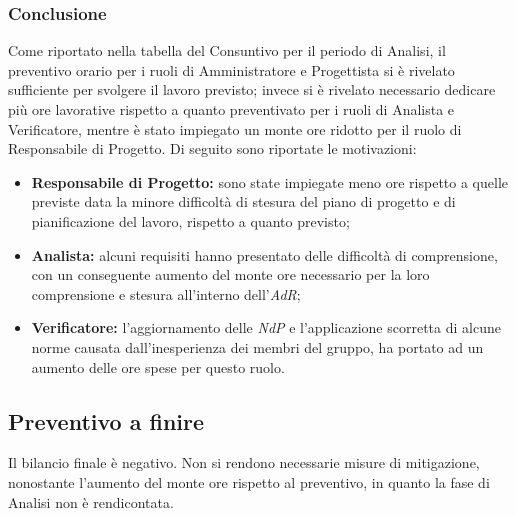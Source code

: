 	\subsubsection{Conclusione}
		Come riportato nella tabella del Consuntivo per il periodo di Analisi, il preventivo orario per i ruoli di Amministratore e Progettista si è rivelato sufficiente per svolgere il lavoro previsto; invece si è rivelato necessario dedicare più ore lavorative rispetto a quanto preventivato per i ruoli di Analista e Verificatore, mentre è stato impiegato un monte ore ridotto per il ruolo di Responsabile di Progetto. Di seguito sono riportate le motivazioni:
		\begin{itemize}
			\item \textbf{Responsabile di Progetto:} sono state impiegate meno ore rispetto a quelle previste data la minore difficoltà di stesura del piano di progetto e di pianificazione del lavoro, rispetto a quanto previsto;
			\item \textbf{Analista:} alcuni requisiti hanno presentato delle difficoltà di comprensione, con un conseguente aumento del monte ore necessario per la loro comprensione e stesura all'interno dell'\textit{AdR{}};
			\item \textbf{Verificatore:} l'aggiornamento delle \textit{NdP{}} e l'applicazione scorretta di alcune norme causata dall'inesperienza dei membri del gruppo, ha portato ad un aumento delle ore spese per questo ruolo.
		\end{itemize}

\subsection{Preventivo a finire}
Il bilancio finale è negativo.
Non si rendono necessarie misure di mitigazione, nonostante l'aumento del monte ore rispetto al preventivo, in quanto la fase di Analisi non è rendicontata.
